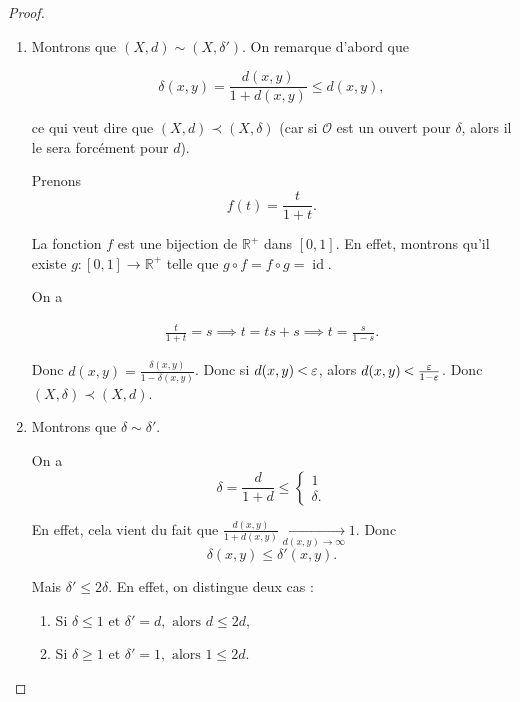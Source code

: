\documentclass[french]{book}
\newcommand{\lesss}{\rotatebox[origin=c]{90}{$\land$}}
\newcommand{\less}{\ \lesss\ }
\begin{document}
\begin{proof}

  \

  \begin{enumerate}
    \item Montrons que \((X, d) \sim (X, \delta')\). On remarque d'abord que

    \[\delta(x,y) = \frac{d(x,y)}{1+ d(x,y)} \leq d(x,y), \]

    ce qui veut dire que \((X, d) \prec (X, \delta)\) (car si \(\mathcal{O}\) est un ouvert pour \(\delta\), alors il le sera forcément pour \(d\)).

    Prenons
    \begin{equation}\label{bij-dist}
      f(t) = \frac{t}{1+t}.
    \end{equation}

    La fonction \(f\) est une bijection de \(\mathbb{R} ^{+}\) dans \([0, 1]\). En effet, montrons qu'il existe \(g : [0, 1] \to \mathbb{R} ^{+}\) telle que $g \circ f = f \circ g = \operatorname{id}$.

    On a

    \begin{gather*}
      \frac{t}{1+t} = s \implies t = ts+s \implies t = \frac{s}{1-s}.
    \end{gather*}

    Donc \(d(x,y) = \frac{\delta(x,y)}{1 - \delta(x,y)}\). Donc si \(d(x,y) \less \varepsilon\), alors \(d(x,y) \less \frac{\varepsilon}{1- \varepsilon}\). Donc \((X,\delta) \prec (X,d)\).

    \item Montrons que \(\delta \sim \delta'\).

    On a \[\delta = \frac{d}{1+d} \leq \begin{cases}
      1 \\
      \delta.
    \end{cases}\]

    En effet, cela vient du fait que \(\frac{d(x,y)}{1+d(x,y)} \underset{d(x,y) \to \infty }{\longrightarrow} 1\). Donc \[\delta(x,y) \leq \delta'(x,y).\]

    Mais \(\delta' \leq 2 \delta\). En effet, on distingue deux cas :

    \begin{enumerate}
      \item Si \(\delta \leq  1 \text{ et } \delta' = d, \text{ alors } d \leq 2 d \),
      \item Si \(\delta \geq  1 \text{ et } \delta' = 1, \text{ alors } 1 \leq 2 d \).
    \end{enumerate}


\end{enumerate}
\end{proof}
\end{document}
